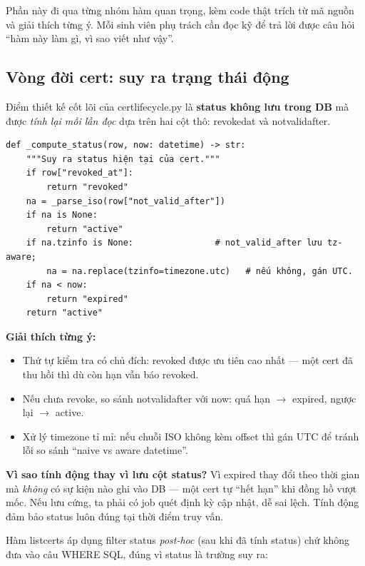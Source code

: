 \documentclass[12pt,a4paper]{article}
\newcommand{\code}[1]{{\ttfamily\small\def\_{\textunderscore\discretionary{}{}{}}#1}}
\begin{document}
Phần này đi qua từng nhóm hàm quan trọng, kèm code thật trích từ mã nguồn và
giải thích từng ý. Mỗi sinh viên phụ trách cần đọc kỹ để trả lời được câu hỏi
``hàm này làm gì, vì sao viết như vậy''.

\subsection{Vòng đời cert: suy ra trạng thái động}

Điểm thiết kế cốt lõi của \code{cert\_lifecycle.py} là \textbf{status không lưu
trong DB} mà được \emph{tính lại mỗi lần đọc} dựa trên hai cột thô:
\code{revoked\_at} và \code{not\_valid\_after}.

\begin{Verbatim}
def _compute_status(row, now: datetime) -> str:
    """Suy ra status hiện tại của cert."""
    if row["revoked_at"]:
        return "revoked"
    na = _parse_iso(row["not_valid_after"])
    if na is None:
        return "active"
    if na.tzinfo is None:                # not_valid_after lưu tz-aware;
        na = na.replace(tzinfo=timezone.utc)   # nếu không, gán UTC.
    if na < now:
        return "expired"
    return "active"
\end{Verbatim}

\textbf{Giải thích từng ý:}
\begin{itemize}
  \item Thứ tự kiểm tra có chủ đích: \code{revoked} được ưu tiên cao nhất ---
    một cert đã thu hồi thì dù còn hạn vẫn báo \code{revoked}.
  \item Nếu chưa revoke, so sánh \code{not\_valid\_after} với \code{now}: quá
    hạn $\to$ \code{expired}, ngược lại $\to$ \code{active}.
  \item Xử lý timezone tỉ mỉ: nếu chuỗi ISO không kèm offset thì gán UTC để
    tránh lỗi so sánh ``naive vs aware datetime''.
\end{itemize}

\begin{notebox}
\textbf{Vì sao tính động thay vì lưu cột \code{status}?} Vì \code{expired} thay
đổi theo thời gian mà \emph{không} có sự kiện nào ghi vào DB --- một cert tự
``hết hạn'' khi đồng hồ vượt mốc. Nếu lưu cứng, ta phải có job quét định kỳ cập
nhật, dễ sai lệch. Tính động đảm bảo status luôn đúng tại thời điểm truy vấn.
\end{notebox}

Hàm \code{\_list\_certs} áp dụng filter status \emph{post-hoc} (sau khi đã tính
status) chứ không đưa vào câu \code{WHERE} SQL, đúng vì status là trường suy ra:
\end{document}
